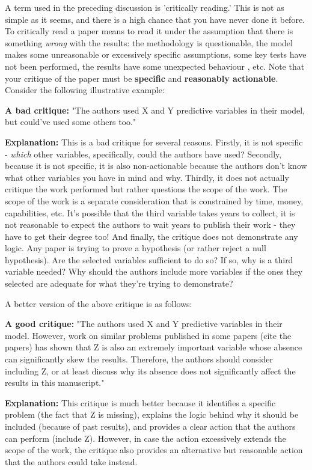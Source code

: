 \documentclass[12pt]{article}
\begin{document}
A term used in the preceding discussion is 'critically reading.' This is not as simple as it seems, and there is a high chance that you have never done it before. To critically read a paper means to read it under the assumption that there is something \textit{wrong} with the results: the methodology is questionable, the model makes some unreasonable or excessively specific assumptions, some key tests have not been performed, the results have some unexpected behaviour , etc. Note that your critique of the paper must be \textbf{specific} and \textbf{reasonably actionable}. Consider the following illustrative example:

\textbf{A bad critique:} "The authors used X and Y predictive variables in their model, but could've used some others too."

\textbf{Explanation:} This is a bad critique for several reasons. Firstly, it is not specific - \textit{which} other variables, specifically, could the authors have used? Secondly, because it is not specific, it is also non-actionable because the authors don't know what other variables you have in mind and why. Thirdly, it does not actually critique the work performed but rather questions the scope of the work. The scope of the work is a separate consideration that is constrained by time, money, capabilities, etc. It's possible that the third variable takes years to collect, it is not reasonable to expect the authors to wait years to publish their work - they have to get their degree too! And finally, the critique does not demonstrate any logic. Any paper is trying to prove a hypothesis (or rather reject a null hypothesis). Are the selected variables sufficient to do so? If so, why is a third variable needed? Why should the authors include more variables if the ones they selected are adequate for what they're trying to demonstrate?

A better version of the above critique is as follows:

\textbf{A good critique:} "The authors used X and Y predictive variables in their model. However, work on similar problems published in some papers (cite the papers) has shown that Z is also an extremely important variable whose absence can significantly skew the results. Therefore, the authors should consider including Z, or at least discuss why its absence does not significantly affect the results in this manuscript."

\textbf{Explanation:} This critique is much better because it identifies a specific problem (the fact that Z is missing), explains the logic behind why it should be included (because of past results), and provides a clear action that the authors can perform (include Z). However, in case the action excessively extends the scope of the work, the critique also provides an alternative but reasonable action that the authors could take instead. 
\end{document}
